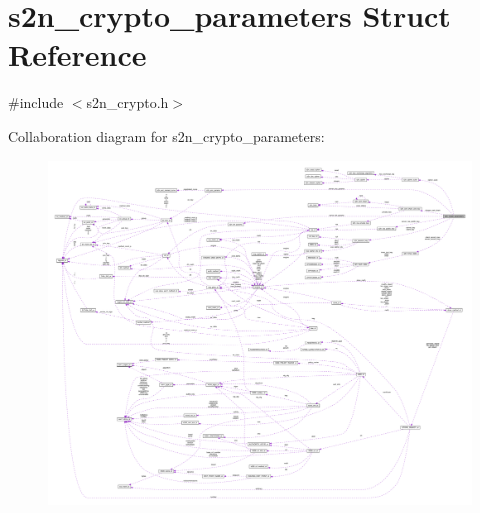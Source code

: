 \hypertarget{structs2n__crypto__parameters}{}\section{s2n\+\_\+crypto\+\_\+parameters Struct Reference}
\label{structs2n__crypto__parameters}


{\ttfamily \#include $<$s2n\+\_\+crypto.\+h$>$}



Collaboration diagram for s2n\+\_\+crypto\+\_\+parameters\+:\nopagebreak
\begin{figure}[H]
\begin{center}
\leavevmode
\includegraphics[width=350pt]{structs2n__crypto__parameters__coll__graph}
\end{center}
\end{figure}

